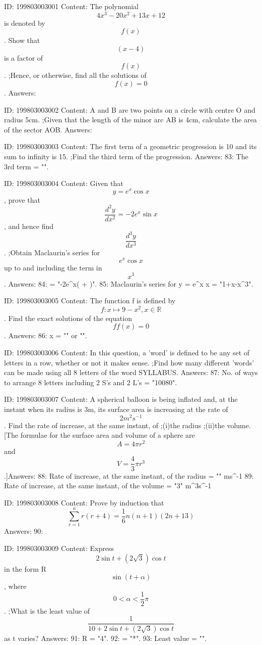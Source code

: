 \documentclass{article}
\begin{document}
ID: 199803003001
Content:
The polynomial $$4 x^3 - 20 x^2 + 13x + 12$$  is denoted by $$f(x)$$. Show that $$(x - 4)$$ is a factor of $$f(x)$$. ;Hence, or otherwise, find all the solutions of $$f(x) = 0$$. Answers:

ID: 199803003002
Content:
A and B are two points on a circle with centre O and radius 5cm. ;Given that the length of the minor arc AB is 4cm, calculate the area of the sector AOB. Answers:

ID: 199803003003
Content:
The first term of a geometric progression is 10 and its sum to infinity is 15. ;Find the third term of the progression. Answers:
83: The 3rd term = "".

ID: 199803003004
Content:
Given that $$y = e^x \cos x$$, prove that $$\frac{d^2 y}{d x^2} = - 2 e^x \sin x$$, and hence find $$\frac{d^3 y}{d x^3}$$.  ;Obtain Maclaurin's series for $$e^x \cos x$$ up to and including the term in $$x^3$$. Answers:
84:  = "-2e^x( + )".
85: Maclaurin's series for y = e^x \cos x = "1+x-x^3".

ID: 199803003005
Content:
The function f is defined by $$f : x \mapsto 9 - x^2, x \in \mathbb{R}$$. Find the exact solutions of the equation $$ff(x) = 0$$. Answers:
86: x = \pm""  or \pm"".

ID: 199803003006
Content:
In this question, a 'word' is defined to be any set of letters in a row, whether or not it makes sense. ;Find how many different 'words' can be made using all 8 letters of the word SYLLABUS. Answers:
87: No. of ways to arrange 8 letters including 2 S's and 2 L's = "10080".

ID: 199803003007
Content:
A spherical balloon is being inflated and, at the instant when its radius is 3m, its surface area is increasing at the rate of $$2 m^2 s^{- 1}$$. Find the rate of increase, at the same instant, of  ;(i)the radius ;(ii)the volume. [The formulae for the surface area and volume of a sphere are $$A = 4\pi r^2$$  and $$V = \frac{4}{3}\pi r^3$$.]Answers:
88: Rate of increase, at the same instant, of the radius = "" ms^{-1}
89: Rate of increase, at the same instant, of the volume = "3" m^3s^{-1}

ID: 199803003008
Content:
Prove by induction that $$\sum^n_{r = 1} r( r + 4 ) = \frac{1}{6}n( n + 1 )( 2n + 13 )$$Answers:
90: 

ID: 199803003009
Content:
Express $$2\sin  t + ( 2\sqrt{3} )\cos  t$$ in the form R $$\sin  ( t + \alpha )$$, where $$0 < \alpha < \frac{1}{2}\pi$$. ;What is the least value of $$\frac{1}{10 + 2\sin  t + ( 2\sqrt{3} )\cos  t}$$ as t varies? Answers:
91: R = "4".
92: \alpha = "*\pi".
93: Least value = "".
\end{document}
